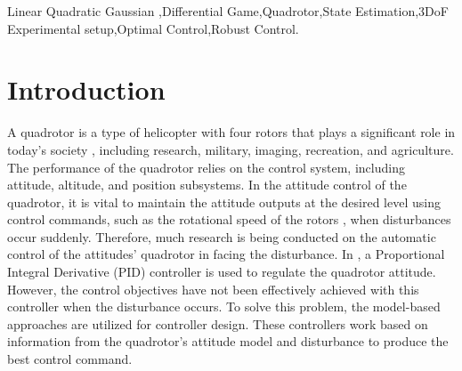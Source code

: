 \documentclass[3p,times]{elsarticle}
\begin{document}
\begin{frontmatter}
\begin{keyword}



Linear Quadratic Gaussian \sep Differential Game\sep Quadrotor\sep State Estimation\sep 3DoF Experimental setup\sep Optimal Control\sep Robust Control.

\end{keyword}

\end{frontmatter}


\section{Introduction}\label{sec:intro}
A quadrotor is a type of helicopter with four rotors that plays a significant role in today's society \cite{drones5030059}, including research, military, imaging, recreation, and agriculture. The performance of the quadrotor relies on the control system, including attitude, altitude, and position subsystems. In the attitude control of the quadrotor, it is vital to maintain the attitude outputs at the desired level using control commands, such as the rotational speed of the rotors \cite{article_Sharifi}, when disturbances occur suddenly. Therefore, much research is being conducted on the automatic control of the attitudes' quadrotor in facing the disturbance.
In \cite{article_Bolandi,article_Abdul}, a Proportional Integral Derivative (PID) controller is used to regulate the quadrotor attitude. However, the control objectives have not been effectively achieved with this controller when the disturbance occurs. To solve this problem, the model-based approaches \cite{bouzid:hal-02543214,9275226} are utilized for controller design. These controllers work based on information from the quadrotor's attitude model and disturbance to produce the best control command.
\end{document}
